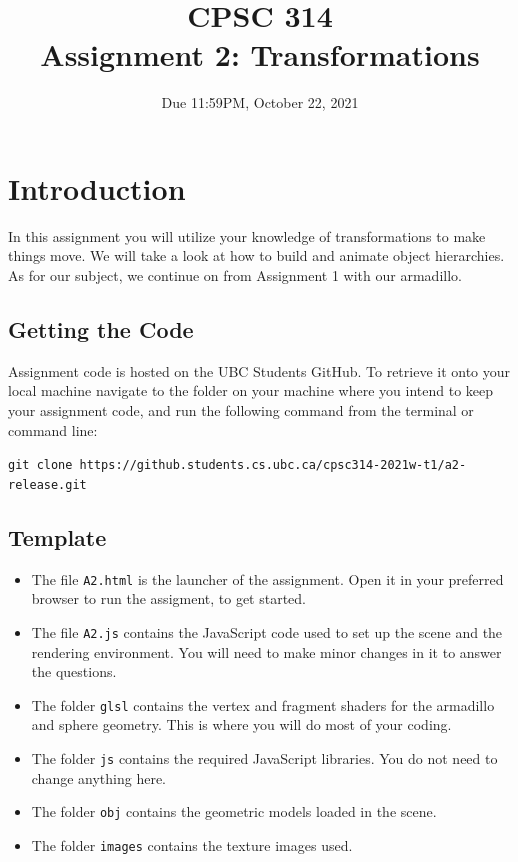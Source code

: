 \documentclass[12pt]{exam}
\begin{document}
\title{CPSC 314\\
  Assignment 2: Transformations}
\date{Due 11:59PM, October 22, 2021}

\maketitle 

\section{Introduction}

In this assignment you will utilize your knowledge of transformations to make things move.
We will take a look at how to build and animate object hierarchies. As for our subject,
we continue on from Assignment 1 with our armadillo.

\subsection{Getting the Code}
Assignment code is hosted on the UBC Students GitHub. To retrieve it
onto your local machine navigate to the folder on your machine where you intend to keep your
assignment code, and run the following command from the terminal or command line:

\medskip
{\tt git clone https://github.students.cs.ubc.ca/cpsc314-2021w-t1/a2-release.git}

\subsection{Template}
\begin{itemize}
\item The file {\tt A2.html} is the launcher of the assignment. Open
  it in your preferred browser to run the assigment, to get started.
\item The file {\tt A2.js} contains the JavaScript code used to set up the scene and the rendering environment. You will need to make minor changes in it to answer the questions.
\item The folder {\tt glsl} contains the vertex and fragment shaders for the armadillo and sphere geometry. This is where you will do most of your coding.
\item The folder {\tt js} contains the required JavaScript libraries. You do not need to change anything here.
\item The folder {\tt obj} contains the geometric models loaded in the scene.
\item The folder {\tt images} contains the texture images used.
\end{itemize}
\end{document}
